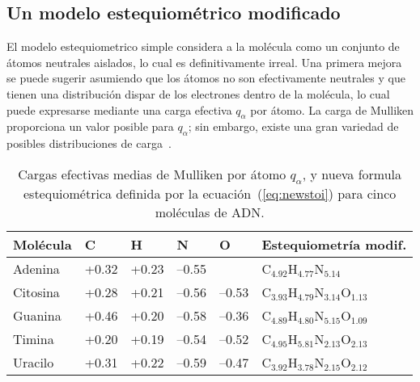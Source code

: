 \subsection{Un modelo estequiométrico modificado}

El modelo estequiometrico simple considera a la molécula como un 
conjunto de átomos neutrales aislados, lo cual es definitivamente irreal.
Una primera mejora se puede sugerir asumiendo que los átomos no son
efectivamente neutrales y que tienen una distribución dispar de los 
electrones dentro de la molécula, lo cual puede expresarse mediante una
carga efectiva $q_{\alpha}$ por átomo. La carga de Mulliken proporciona
un valor posible para $q_{\alpha}$; sin embargo, existe una gran variedad
de posibles distribuciones de carga~\cite{lee2003}.

\begin{table}
\begin{center}
\begin{tabular}{|p{}|p{}|p{}|p{
}|p{}|p{}|}
\hline
Molécula & C & H & N & O & Estequiometría modif. \\
\hline
Adenina & +0.32 & +0.23 & --0.55 &       & 
C$_{4.92}$H$_{4.77}$N$_{5.14}$ \\ 
\hline
Citosina & +0.28 & +0.21 & --0.56 & --0.53 & 
C$_{3.93}$H$_{4.79}$N$_{3.14}$O$_{1.13}$ \\ 
\hline
Guanina & +0.46 & +0.20 & --0.58 & --0.36 & 
C$_{4.89}$H$_{4.80}$N$_{5.15}$O$_{1.09}$ \\ 
\hline
Timina & +0.20 & +0.19 & --0.54 & --0.52 & 
C$_{4.95}$H$_{5.81}$N$_{2.13}$O$_{2.13}$ \\ 
\hline
Uracilo & +0.31 & +0.22 & --0.59 & --0.47 & 
C$_{3.92}$H$_{3.78}$N$_{2.15}$O$_{2.12}$ \\ 
\hline
\end{tabular}
\caption[Cargas efectivas medias de Mulliken por átomo]
{Cargas efectivas medias de Mulliken por átomo $q_{\alpha}$, y nueva formula
estequiométrica definida por la ecuación~(\ref{eq:newstoi}) para cinco
moléculas de ADN.}
\label{tab:newstoi}
\end{center}
\end{table}

